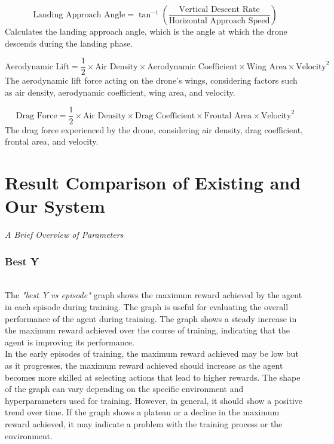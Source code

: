 \documentclass[preprint,12pt]{elsarticle}
\begin{document}
\begin{equation}
\text{Landing Approach Angle} = \tan^{-1}\left(\frac{\text{Vertical Descent Rate}}{\text{Horizontal Approach Speed}}\right)
\end{equation}
Calculates the landing approach angle, which is the angle at which the drone descends during the landing phase.

\begin{equation}
\text{Aerodynamic Lift} = \frac{1}{2} \times \text{Air Density} \times \text{Aerodynamic Coefficient} \times \text{Wing Area} \times \text{Velocity}^2
\end{equation}
The aerodynamic lift force acting on the drone's wings, considering factors such as air density, aerodynamic coefficient, wing area, and velocity.

\begin{equation}
\text{Drag Force} = \frac{1}{2} \times \text{Air Density} \times \text{Drag Coefficient} \times \text{Frontal Area} \times \text{Velocity}^2
\end{equation}
The drag force experienced by the drone, considering air density, drag coefficient, frontal area, and velocity.




\section{Result Comparison of Existing and Our System}
\textit{A Brief Overview of Parameters}\\


\subsubsection{Best Y}\\
The \textit{"best Y vs episode" }graph shows the maximum reward achieved by the agent in each episode during training. The graph is useful for evaluating the overall performance of the agent during training. The graph shows a steady increase in the maximum reward achieved over the course of training, indicating that the agent is improving its performance.\\

In the early episodes of training, the maximum reward achieved may be low but as it progresses, the maximum reward achieved should increase as the agent becomes more skilled at selecting actions that lead to higher rewards.
The shape of the graph can vary depending on the specific environment and hyperparameters used for training. However, in general, it should show a positive trend over time. If the graph shows a plateau or a decline in the maximum reward achieved, it may indicate a problem with the training process or the environment. \\
\end{document}
